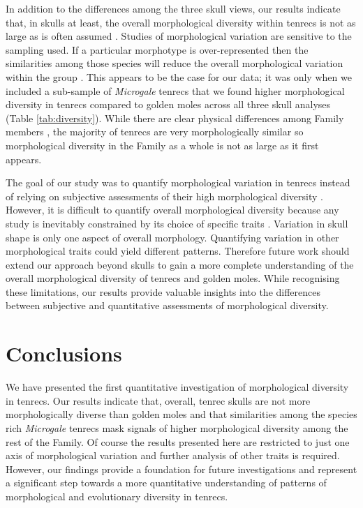 \documentclass[12pt,a4paper]{article}
\begin{document}
	In addition to the differences among the three skull views, our results indicate that, in skulls at least, the overall morphological diversity within tenrecs is not as large as is often assumed \citep[e.g.][]{Eisenberg1969, Olson2013}. Studies of morphological variation are sensitive to the sampling used. If a particular morphotype is over-represented then the similarities among those species will reduce the overall morphological variation within the group \citep{Foote1991}. This appears to be the case for our data; it was only when we included a sub-sample of \textit{Microgale} tenrecs that we found higher morphological diversity in tenrecs compared to golden moles across all three skull analyses (Table \ref{tab:diversity}).
	While there are clear physical differences among Family members \citep{Olson2013, Eisenberg1969}, the majority of tenrecs are very morphologically similar \citep{Jenkins2003} so morphological diversity in the Family as a whole is not as large as it first appears.  
	
	The goal of our study was to quantify morphological variation in tenrecs instead of relying on subjective assessments of their high morphological diversity \citep{Olson2013, Soarimalala2011, Eisenberg1969}. However, it is difficult to quantify overall morphological diversity because any study is inevitably constrained by its choice of specific traits \citep{Roy1997}. Variation in skull shape is only one aspect of overall morphology. Quantifying variation in other morphological traits could yield different patterns. Therefore future work should extend our approach beyond skulls to gain a more complete understanding of the overall morphological diversity of tenrecs and golden moles.
	While recognising these limitations, our results provide valuable insights into the differences between subjective and quantitative assessments of morphological diversity. 

\section{Conclusions}
	We have presented the first quantitative investigation of morphological diversity in tenrecs. Our results indicate that, overall, tenrec skulls are not more morphologically diverse than golden moles and that similarities among the species rich \textit{Microgale} tenrecs mask signals of higher morphological diversity among the rest of the Family. Of course the results presented here are restricted to just one axis of morphological variation and further analysis of other traits is required. However, our findings provide a foundation for future investigations and represent a significant step towards a more quantitative understanding of patterns of morphological and evolutionary diversity in tenrecs. 
\end{document}
